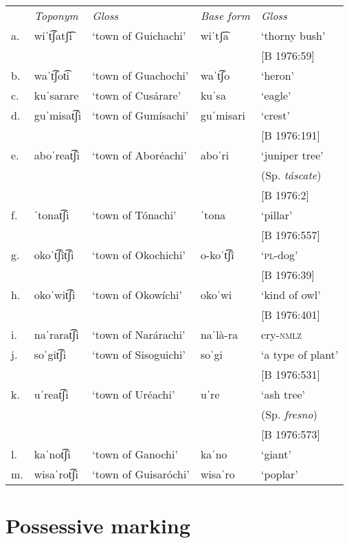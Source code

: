 \begin{tabular}{lllll}
    & \textit{Toponym} & \textit{Gloss} & \textit{Base form} & \textit{Gloss} \\
     a.& wiˈt͡ʃatʃ͡i & `town of Guichachi' &  wiˈtʃ͡a &  ‘thorny bush' \\
      & & & &  [B 1976:59]\\
     b.& waˈt͡ʃot͡i & `town of Guachochi' & waˈt͡ʃo & `heron' \\
     c.& kuˈsarare & `town of Cusárare' & kuˈsa & `eagle' \\
     d.& guˈmisat͡ʃi & `town of Gumísachi'  & guˈmisari & `crest' \\
      & & & & [B 1976:191]\\
     e.& aboˈreat͡ʃi & `town of Aboréachi' & aboˈri & `juniper tree' \\
     & & & &   (Sp. \textit{táscate})\\
      & & & &   [B 1976:2]\\
     f.& ˈtonat͡ʃi & `town of Tónachi'  & ˈtona & `pillar' \\
      & & & &  [B 1976:557]\\
     g.& okoˈt͡ʃît͡ʃi& `town of Okochichi' & o-koˈt͡ʃî & `\textsc{pl-}dog' \\
      & & & & [B 1976:39]\\
     h.& okoˈwit͡ʃi & `town of Okowíchi' & okoˈwi & `kind of owl' \\
      & & & & [B 1976:401]\\
     i.& naˈrarat͡ʃi &  `town of Narárachi' & naˈlà-ra & cry-\textsc{nmlz} \\
     j.& soˈgit͡ʃi &  `town of Sisoguichi' & soˈgi &  `a type of plant' \\
      & & & &  [B 1976:531] \\
     k.& uˈreat͡ʃi &  `town of Uréachi' & uˈre & `ash tree'  \\
     & & & &  (Sp. \textit{fresno})\\
      & & & &  [B 1976:573]\\
     l.&  kaˈnot͡ʃi &  `town of Ganochi'  & kaˈno & `giant' \\
     m.& wisaˈrot͡ʃi &  `town of Guisaróchi' & wisaˈro & `poplar' \\
\end{tabular}
    \z

\section{Possessive marking}
\label{sec: possessive marking}

